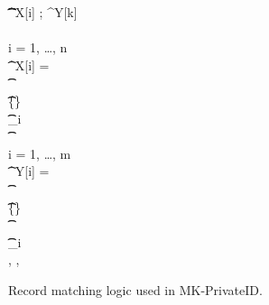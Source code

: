 \begin{figure}[h]
\begin{pchstack}
{      \t	\t	\t	\t	\t	{}^X[i] \gets \top; \;^Y[k] \gets \top \pcskipln\\
       \\
      \pcfor i = 1, \dots, n \\
      \t 	\pcif {}^X[i] = \bot \pcthen \label{lin:match_unmatched_C_uid} \\
      \t	\t	\uid \sample \calG \setminus \UID \\
      \t	\t	\UID \gets \UID \cup \{\uid\} \\
      \t	\t	\MX[\uid] \gets \bx_i \\
      \t	\t	\MY[\uid] \gets \bot \\
      \pcfor i = 1, \dots, m \\
      \t 	\pcif {}^Y[i] = \bot \pcthen \label{lin:match_unmatched_P_uid} \\
      \t	\t	\uid \sample \calG \setminus \UID \\
      \t	\t	\UID \gets \UID \cup \{\uid\} \\
      \t	\t	\MX[\uid] \gets \bot \\
      \t	\t	\MY[\uid] \gets \by_i \\
      \pcreturn \UID, \MX, \MY
    }
  \end{pchstack}
  \caption{Record matching logic used in MK-PrivateID. \label{fig:match_logic}}
\end{figure}
